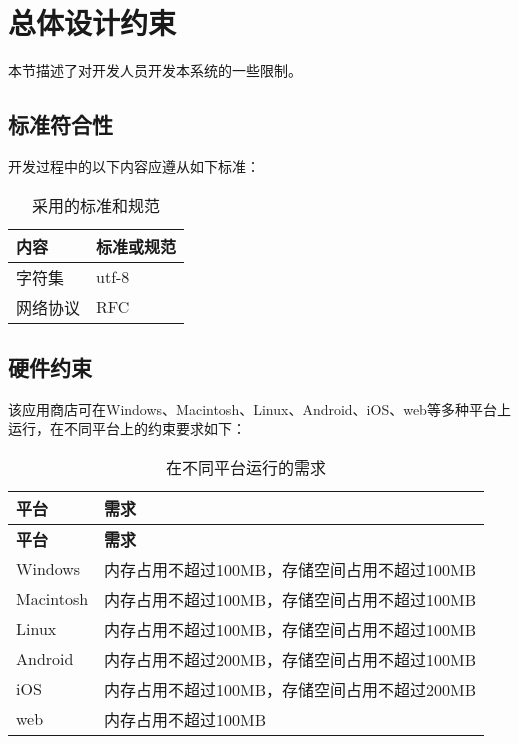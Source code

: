 \chapter{总体设计约束}
本节描述了对开发人员开发本系统的一些限制。
 
\section{标准符合性}
开发过程中的以下内容应遵从如下标准：\\
\begin{longtable}{|p{4cm}|p{10cm}|}
\caption{采用的标准和规范}\label{tab:standards_constraints} \\
\hline
内容 & 标准或规范\\
\hline
字符集 & utf-8\\
网络协议 & RFC\\
\hline
\end{longtable}





\section{硬件约束}
该应用商店可在Windows、Macintosh、Linux、Android、iOS、web等多种平台上运行，在不同平台上的约束要求如下：\\

\begin{longtable}{|p{4cm}|p{10cm}|}
\caption{在不同平台运行的需求}\label{tab:hardware_constraints} \\
\hline
\textbf{平台} & \textbf{需求}     \\
\hline
\endfirsthead
\hline
\textbf{平台} & \textbf{需求}    \\
\hline
\endhead
\hline 
\endfoot
\hline
\endlastfoot
Windows & 内存占用不超过100MB，存储空间占用不超过100MB \\
Macintosh & 内存占用不超过100MB，存储空间占用不超过100MB \\
Linux & 内存占用不超过100MB，存储空间占用不超过100MB \\
Android & 内存占用不超过200MB，存储空间占用不超过100MB\\
iOS & 内存占用不超过100MB，存储空间占用不超过200MB\\
web & 内存占用不超过100MB \\
\end{longtable}

